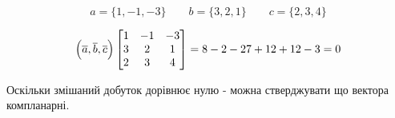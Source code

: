 {}

$$
a = \{1,-1,-3\} \qquad b=\{3,2,1\}  \qquad c=\{2,3,4\}
$$

$$
 \Big(\V{a},\V{b},\V{c} \Big)
\begin{bmatrix}
  1 &  -1 &  -3 \\
  3 &  2 &  1 \\
  2 &  3 &  4 \\
\end{bmatrix} =
8 - 2 -27 +12 +12 - 3 = 0

$$

Оскільки змішаний добуток дорівнює нулю - можна стверджувати що вектора компланарні.
